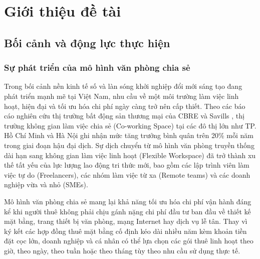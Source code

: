 \chapter{Giới thiệu đề tài}
\label{ch:gioithieu}

\section{Bối cảnh và động lực thực hiện}
\label{sec:boicanh}

\subsection{Sự phát triển của mô hình văn phòng chia sẻ}
Trong bối cảnh nền kinh tế số và làn sóng khởi nghiệp đổi mới sáng tạo đang phát triển mạnh mẽ tại Việt Nam, nhu cầu về một môi trường làm việc linh hoạt, hiện đại và tối ưu hóa chi phí ngày càng trở nên cấp thiết. Theo các báo cáo nghiên cứu thị trường bất động sản thương mại của CBRE và Savills \cite{fielding2000rest}, thị trường không gian làm việc chia sẻ (Co-working Space) tại các đô thị lớn như TP. Hồ Chí Minh và Hà Nội ghi nhận mức tăng trưởng bình quân trên 20\% mỗi năm trong giai đoạn hậu đại dịch. Sự dịch chuyển từ mô hình văn phòng truyền thống dài hạn sang không gian làm việc linh hoạt (Flexible Workspace) đã trở thành xu thế tất yếu của lực lượng lao động tri thức mới, bao gồm các lập trình viên làm việc tự do (Freelancers), các nhóm làm việc từ xa (Remote teams) và các doanh nghiệp vừa và nhỏ (SMEs).

Mô hình văn phòng chia sẻ mang lại khả năng tối ưu hóa chi phí vận hành đáng kể khi người thuê không phải chịu gánh nặng chi phí đầu tư ban đầu về thiết kế mặt bằng, trang thiết bị văn phòng, mạng Internet hay dịch vụ lễ tân. Thay vì ký kết các hợp đồng thuê mặt bằng cố định kéo dài nhiều năm kèm khoản tiền đặt cọc lớn, doanh nghiệp và cá nhân có thể lựa chọn các gói thuê linh hoạt theo giờ, theo ngày, theo tuần hoặc theo tháng tùy theo nhu cầu sử dụng thực tế.

